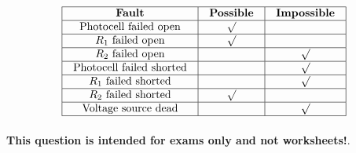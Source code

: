 $$\vbox{\offinterlineskip
\halign{\strut
\vrule \quad\hfil # \ \hfil & 
\vrule \quad\hfil # \ \hfil & 
\vrule \quad\hfil # \ \hfil \vrule \cr
\noalign{\hrule}
%
{\bf Fault} & {\bf Possible} & {\bf Impossible} \cr
%
\noalign{\hrule}
%
Photocell failed open & $\surd$ &  \cr
%
\noalign{\hrule}
%
$R_1$ failed open & $\surd$ &  \cr
%
\noalign{\hrule}
%
$R_2$ failed open &  & $\surd$ \cr
%
\noalign{\hrule}
%
Photocell failed shorted &  & $\surd$ \cr
%
\noalign{\hrule}
%
$R_1$ failed shorted &  & $\surd$ \cr
%
\noalign{\hrule}
%
$R_2$ failed shorted & $\surd$ &  \cr
%
\noalign{\hrule}
%
Voltage source dead &  & $\surd$ \cr
%
\noalign{\hrule}
} %
}$$ %







{\bf This question is intended for exams only and not worksheets!}.


